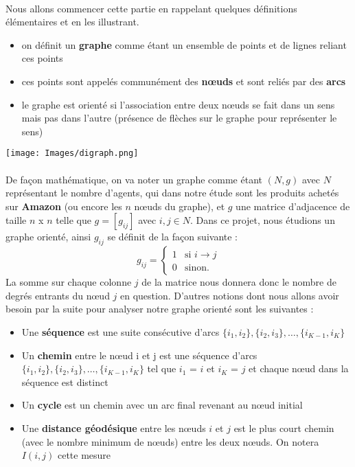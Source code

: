 \documentclass[14pt, openany]{article}
\begin{document}
\paragraph{}
Nous allons commencer cette partie en rappelant quelques définitions élémentaires et en les illustrant.
\begin{itemize}
\item on définit un \textbf{graphe} comme étant un ensemble de points et de lignes reliant ces points
\item ces points sont appelés communément des \textbf{nœuds} et sont reliés par des \textbf{arcs}
\item le graphe est orienté si l'association entre deux nœuds se fait dans un sens mais pas dans l'autre (présence de flèches sur le graphe pour représenter le sens)
\end{itemize} 
\texttt{[image: Images/digraph.png]}
\begin{center}
\label{fig1}
\end{center}
\paragraph{}
De façon mathématique, on va noter un graphe comme étant $(N,g)$ avec $N$ représentant le nombre d'agents, qui dans notre étude sont les produits achetés sur \textbf{Amazon} (ou encore les $n$ nœuds du graphe), et $g$ une matrice d'adjacence de taille $n$ x $n$ telle que $g = [g_{ij}]$ avec $i,j \in N$. Dans ce projet, nous étudions un graphe orienté, ainsi $g_{ij}$ se définit de la façon suivante :
$$
g_{ij} = \left\{
    \begin{array}{ll}
        1 & \mbox{si } i \rightarrow j \\
        0 & \mbox{sinon.}
    \end{array}
\right.
$$
La somme sur chaque colonne $j$ de la matrice nous donnera donc le nombre de degrés entrants du nœud $j$ en question. D'autres notions dont nous allons avoir besoin par la suite pour analyser notre graphe orienté sont les suivantes :
\begin{itemize}
\item Une \textbf{séquence} est une suite consécutive d'arcs $\{i_1, i_2\} , \{i_2, i_3\} ,…, \{i_{K-1}, i_K\}$
\item Un \textbf{chemin} entre le nœud i et j est une séquence d'arcs
$\{i_1, i_2\} , \{i_2, i_3\} ,…, \{i_{K-1}, i_K\}$ tel que $i_1$ = $i$ et $i_K$ = $j$ et chaque nœud dans la séquence est distinct
\item Un \textbf{cycle} est un chemin avec un arc final revenant au nœud initial
\item Une \textbf{distance géodésique} entre les nœuds $i$ et $j$ est le plus court chemin (avec le nombre minimum de nœuds) entre les deux nœuds. On notera $I(i,j)$ cette mesure
\end{itemize}
\end{document}
